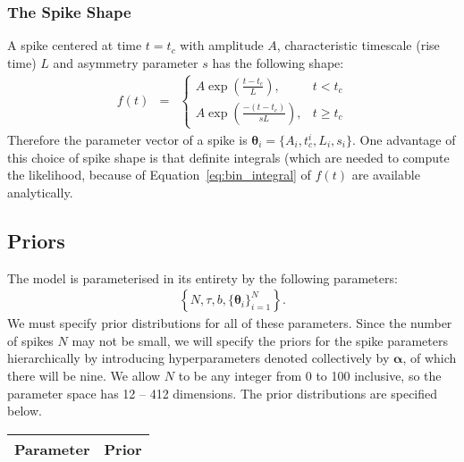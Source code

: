 \documentclass[a4paper, 11pt]{article}
\begin{document}
\subsubsection{The Spike Shape}
A spike centered at time $t=t_c$ with amplitude $A$, characteristic timescale
(rise time) $L$ and asymmetry parameter $s$ has the following shape:
\begin{eqnarray}
f(t) &=& \left\{
\begin{array}{lr}
A\exp\left(\frac{t - t_c}{L}\right), & t < t_c\\
A\exp\left(\frac{-(t - t_c)}{sL}\right), & t \geq t_c
\end{array}
\right.
\end{eqnarray}
Therefore the parameter vector of a spike is
$\boldsymbol{\theta}_i = \{A_i, t_c^i, L_i, s_i\}$. One advantage of this
choice of spike shape is that definite integrals (which are needed to compute
the likelihood, because of Equation~\ref{eq:bin_integral} of $f(t)$ are
available analytically.

\subsection{Priors}
The model is parameterised in its entirety by the following parameters:
\begin{eqnarray}
\left\{
N, \tau, b, \{\boldsymbol{\theta}_i\}_{i=1}^N
\right\}.
\end{eqnarray}
We must specify prior distributions for all of these parameters. Since the
number of spikes $N$ may not be small, we will specify the priors for the
spike parameters hierarchically by introducing hyperparameters
denoted collectively by $\boldsymbol{\alpha}$, of which there will be nine.
We allow $N$ to be any integer from 0 to 100 inclusive, so
the parameter space has 12 -- 412 dimensions. The prior distributions are
specified below.

\begin{table}[!ht]
\begin{center}
\begin{tabular}{cc}
\hline
Parameter			&		Prior\\
\hline

\end{tabular}
\end{center}
\end{table}


{}
\end{document}
